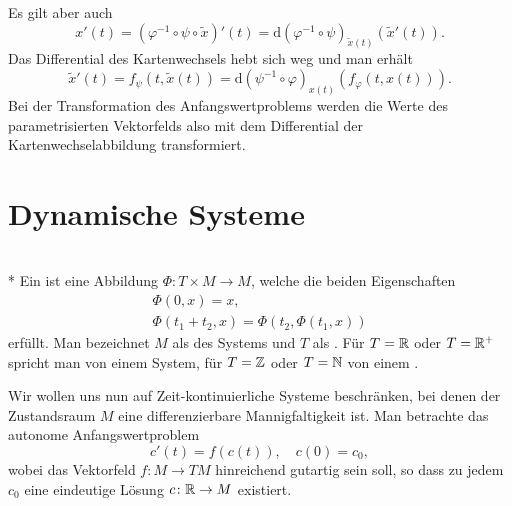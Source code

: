 Es gilt aber auch
\begin{equation}
x'(t) = (\varphi^{-1}\circ\psi\circ\tilde x)'(t)
= \mathrm d(\varphi^{-1}\circ\psi)_{\tilde x(t)}(\tilde x'(t)).
\end{equation}
Das Differential des Kartenwechsels hebt sich weg und man
erhält%
\begin{equation}
\tilde x'(t) = f_\psi(t,\tilde x(t))
= \mathrm d(\psi^{-1}\circ\varphi)_{x(t)}(f_\varphi(t,x(t))).
\end{equation}
Bei der Transformation des Anfangswertproblems werden die Werte des
parametrisierten Vektorfelds also mit dem Differential der
Kartenwechselabbildung transformiert.

\newpage
\section{Dynamische Systeme}

\begin{definition}%
\mbox{}\\*
Ein  ist eine Abbildung
$\Phi\colon T\times M\to M$, welche
die beiden Eigenschaften
\begin{gather}
\label{eq:dyn-Sys-1}
\Phi(0,x) = x,\\
\label{eq:dyn-Sys-2}
\Phi(t_1+t_2,x) = \Phi(t_2,\Phi(t_1,x))
\end{gather}
erfüllt. Man bezeichnet $M$ als  des Systems und
$T$ als .
Für $T=\mathbb R$ oder $T=\mathbb R^+$ spricht man von einem
 System, für $T=\mathbb Z$ oder $T=\mathbb N$ von einem
.
\end{definition}

\noindent
Wir wollen uns nun auf Zeit-kontinuierliche Systeme beschränken,
bei denen der Zustandsraum $M$ eine differenzierbare Mannigfaltigkeit
ist. Man betrachte das autonome Anfangswertproblem
\begin{equation}\label{eq:AWP-M}
c'(t) = f(c(t)),\quad c(0)=c_0,
\end{equation}
wobei das Vektorfeld $f\colon M\to TM$ hinreichend gutartig sein soll,
so dass zu jedem $c_0$ eine eindeutige Lösung $c\colon\mathbb R\to M$
existiert. 

